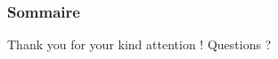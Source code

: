 \documentclass[notes,handout]{beamer}
\begin{document}
\begin{frame}
  \frametitle{Sommaire}
  \tableofcontents
\end{frame}




% 

% 

% 

% 




\appendix   %


\tiny
\printbibliography


  \begin{frame}
    \Large
    \begin{exampleblock}{\centering \LARGE Thank you for your kind attention \Large \Smiley{} !}\LARGE
      \centering
      Questions ?
    \end{exampleblock}

  \end{frame}
\end{document}
